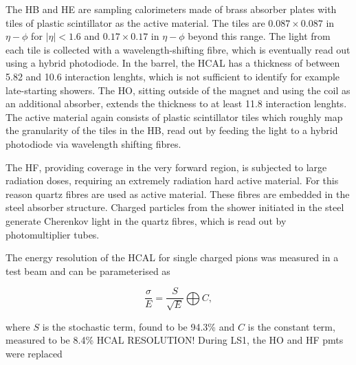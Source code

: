 The \ac{HB} and \ac{HE} are sampling calorimeters made of brass absorber
plates with tiles of plastic scintillator as the active material. The tiles 
are $0.087 \times 0.087$ in $\eta-\phi$ for $|\eta|<1.6$ and $0.17\times0.17$ in $\eta-\phi$
beyond this range.
The light from each tile is collected with a wavelength-shifting fibre, 
which is eventually read out using a hybrid photodiode. In the barrel, the \ac{HCAL}
has a thickness of between 5.82 and 10.6 interaction lenghts, which is not 
sufficient to identify for example late-starting showers. The \ac{HO}, sitting
outside of the magnet and using the coil as an additional absorber, extends the 
thickness to at least 11.8 interaction lenghts. 
The active material again consists of plastic scintillator tiles which roughly
map the granularity of the tiles in the \ac{HB}, read out by feeding the light
to a hybrid photodiode via wavelength shifting fibres.

The \ac{HF}, providing coverage in the very forward region, is 
subjected to large radiation doses, requiring an extremely
radiation hard active material. For this reason quartz
fibres are used as active material. These fibres are embedded
in the steel absorber structure. Charged particles from the
shower initiated in the steel generate Cherenkov light in 
the quartz fibres, which is read out by photomultiplier tubes.

The energy resolution of the \ac{HCAL} for single charged pions 
was measured in a test beam \cite{cms-hcalecal}
and can be parameterised as 

\begin{equation}\label{eqn:hcal_res}
\frac{\sigma}{E} = \frac{S}{\sqrt{E}} \bigoplus C,
\end{equation}

where $S$ is the stochastic term, found to be 94.3\% %
and $C$ is the constant term, measured to be 8.4\% %
HCAL RESOLUTION!
During LS1, the \ac{HO} and \ac{HF} pmts were replaced 



